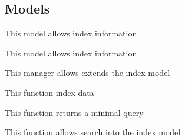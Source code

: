 \documentclass[letterpaper,10pt,english]{sphinxmanual}
\begin{document}
\subsection{Models}
\label{modules/search:models}
This model allows index information
\label{modules/search:module-apps.search.models}

\begin{fulllineitems}
\label{modules/search:apps.search.models.Index}
This model allows index information

\end{fulllineitems}


\begin{fulllineitems}
\label{modules/search:apps.search.models.IndexManager}
This manager allows extends the index model

\begin{fulllineitems}
\label{modules/search:apps.search.models.IndexManager.create}
This function index data

\end{fulllineitems}


\begin{fulllineitems}
\label{modules/search:apps.search.models.IndexManager.min_search}
This function returns a minimal query

\end{fulllineitems}


\begin{fulllineitems}
\label{modules/search:apps.search.models.IndexManager.search}
This function allows search into the index model

\end{fulllineitems}


\end{fulllineitems}
\end{document}
